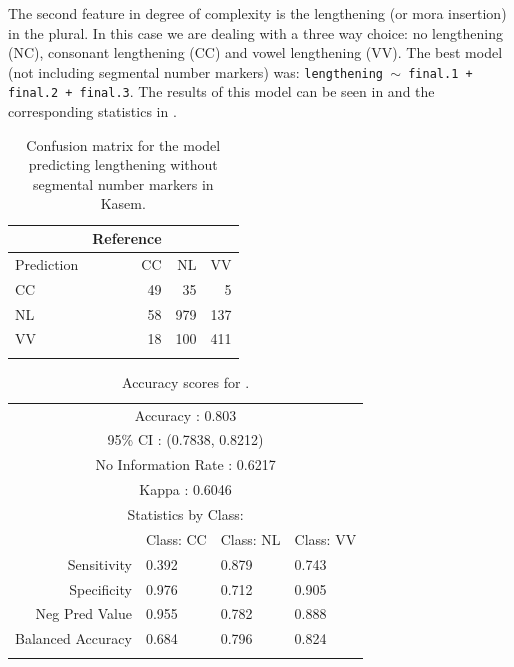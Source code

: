 The second feature in degree of complexity is the lengthening (or mora insertion) in the plural. In this case we are dealing with a three way choice: no lengthening (NC), consonant lengthening (CC) and vowel lengthening (VV). The best model (not including segmental number markers) was: \texttt{lengthening $\sim$ final.1 + final.2 + final.3}. The results of this model can be seen in  and the corresponding statistics in .

\begin{table}[!htpb]
  \centering
  \begin{tabular}{lrrr}
    \lsptoprule
    &          Reference\\
    \midrule
    Prediction  &CC  &NL  &VV\\
    CC  &49  &35   &5\\
    NL  &58 &979 &137\\
    VV  &18 &100 &411\\
    \lspbottomrule
  \end{tabular}
    \caption{Confusion matrix for the model predicting lengthening without segmental number markers in Kasem.}
  \label{tab:length-kasem-1}
\end{table}

\begin{table}[!htpb]
  \centering
  \begin{tabular}{rlll}
    \lsptoprule
    \multicolumn{4}{c}{Overall Statistics}                \\
    \midrule
    \multicolumn{4}{c}{Accuracy : 0.803}                  \\
    \multicolumn{4}{c}{95\% CI : (0.7838, 0.8212)}        \\
    \multicolumn{4}{c}{No Information Rate : 0.6217}      \\
    \multicolumn{4}{c}{Kappa : 0.6046}                    \\
    \midrule
    \multicolumn{4}{c}{Statistics by Class:}              \\
    \midrule
                      & Class: CC & Class: NL & Class: VV \\
    Sensitivity       & 0.392     & 0.879     & 0.743     \\
    Specificity       & 0.976     & 0.712     & 0.905     \\
    Neg Pred Value    & 0.955     & 0.782     & 0.888     \\
    Balanced Accuracy & 0.684     & 0.796     & 0.824     \\
    \lspbottomrule
  \end{tabular}
  \caption{Accuracy scores for .}\label{tab:length-kasem-1-stats}
\end{table}

